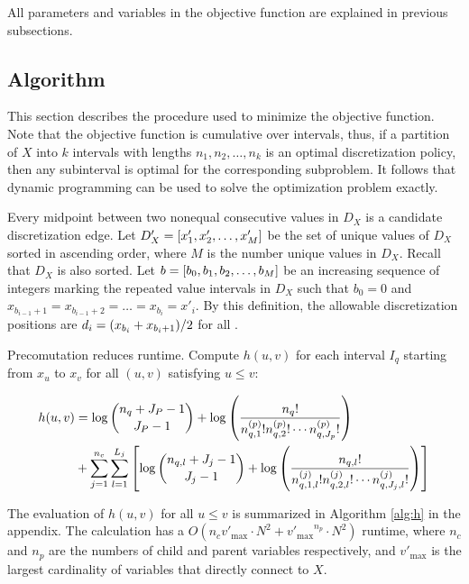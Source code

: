 All parameters and variables in the objective function are explained in previous subsections.

\subsection{Algorithm}

This section describes the procedure used to minimize the objective function.
Note that the objective function is cumulative over intervals, thus, if a partition of $X$ into $k$ intervals with lengths $n_1,n_2,\ldots,n_k$ is an optimal discretization policy, then any subinterval is optimal for the corresponding subproblem.
It follows that dynamic programming can be used to solve the optimization problem exactly.

Every midpoint between two nonequal consecutive values in $D_X$ is a candidate discretization edge.
Let ${D'_X} = \brock{x'_1,x'_2,\ldots,x'_M}$ be the set of unique values of $D_X$ sorted in ascending order, where $M$ is the number unique values in $D_X$.
Recall that $D_X$ is also sorted.
Let $b = \brock{b_0,b_1,b_2,\ldots,b_M}$ be an increasing sequence of integers marking the repeated value intervals in $D_X$ such that $b_0 = 0$ and $x_{b_{i-1} + 1} = x_{b_{i-1} + 2} = \ldots = x_{b_i} = x'_i$.
By this definition, the allowable discretization positions are $d_i = \paren{x_{b_{i}} + x_{{b_i}+1}}/2$ for all .

Precomutation reduces runtime.
Compute $h(u,v)$ for each interval $I_q$ starting from $x_{u}$ to $x_{v}$ for all $(u,v)$ satisfying $u \leq v$:

\begin{small}
\begin{equation}
\begin{aligned}
h(u,v) &=  \log {{n_{q} + J_P - 1}\choose{J_P-1}} + \log \left( { {{n_q}!}\over{ {n^{(p)}_{q,1} !} {n^{(p)}_{q,2} !} \cdots {n^{(p)}_{q,J_p} !}} } \right) \\
& + \sum_{j=1}^{n_c} \sum_{l=1}^{L_j} \left[  \log{{n_{q,l} + J_j - 1}\choose{J_j-1}} + \log \left( { {{n_{q,l}}!}\over{ {n^{(j)}_{q,1,l} !} {n^{(j)}_{q,2,l} !} \cdots {n^{(j)}_{q,J_j,l} !}} } \right) \right]
\end{aligned}
\end{equation}
\end{small}

The evaluation of $h(u,v)$ for all $u \leq v$ is summarized in Algorithm \ref{alg:h} in the appendix.
The calculation has a $O(n_c  {v'_\text{max}} \cdot N^2 + {v'_\text{max}}^{n_p} \cdot N^2)$ runtime, where $n_c$ and $n_p$ are the numbers of child and parent variables respectively, and $v'_\text{max}$ is the largest cardinality of variables that directly connect to $X$. 

